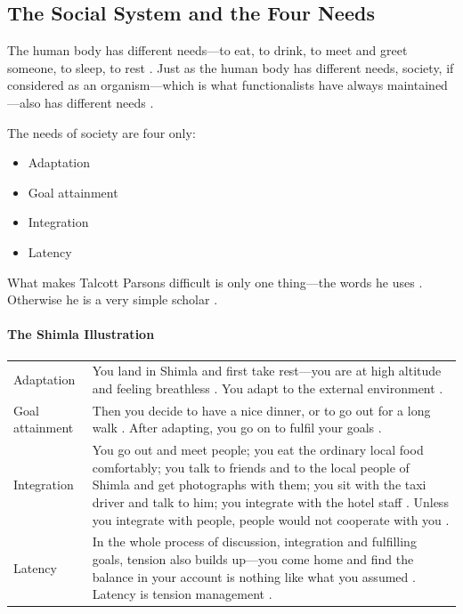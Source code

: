 \subsection{The Social System and the Four Needs}
The human body has different needs---to eat, to drink, to meet and greet someone, to sleep, to rest . Just as the human body has different needs, society, if considered as an organism---which is what functionalists have always maintained---also has different needs .

\begin{KeyConcept}
The needs of society are four only:
\begin{itemize}
    \item Adaptation
    \item Goal attainment
    \item Integration
    \item Latency
\end{itemize}
What makes Talcott Parsons difficult is only one thing---the words he uses . Otherwise he is a very simple scholar .
\end{KeyConcept}

\paragraph{The Shimla Illustration}
\vspace{6pt}
\noindent
\begin{tabularx}{\textwidth}{>{\hsize}Y >{\hsize}Y}
\toprule
{}
 &  \\
\midrule
Adaptation & You land in Shimla and first take rest---you are at high altitude and feeling breathless . You adapt to the external environment . \\
\midrule
Goal attainment & Then you decide to have a nice dinner, or to go out for a long walk . After adapting, you go on to fulfil your goals . \\
\midrule
Integration & You go out and meet people; you eat the ordinary local food comfortably; you talk to friends and to the local people of Shimla and get photographs with them; you sit with the taxi driver and talk to him; you integrate with the hotel staff . Unless you integrate with people, people would not cooperate with you . \\
\midrule
Latency & In the whole process of discussion, integration and fulfilling goals, tension also builds up---you come home and find the balance in your account is nothing like what you assumed . Latency is tension management . \\
\bottomrule
\end{tabularx}
\vspace{6pt}

